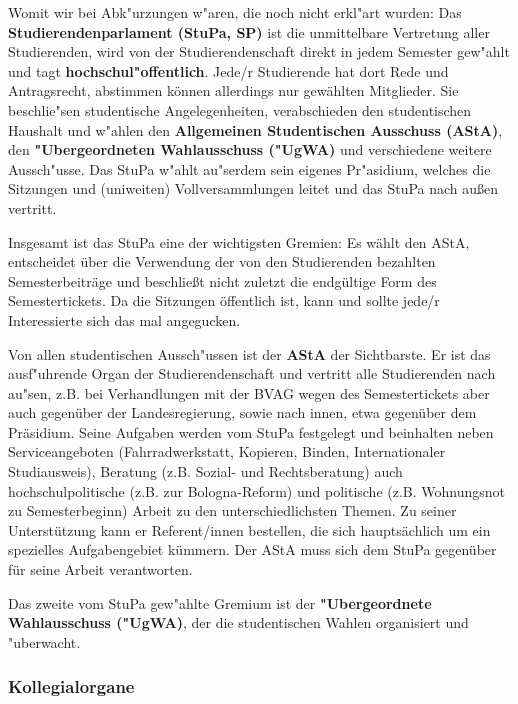 Womit wir bei Abk"urzungen w"aren, die noch nicht erkl"art wurden: Das \textbf{Studierendenparlament (StuPa, SP)} ist die 
unmittelbare Vertretung aller Studierenden, wird von der Studierendenschaft 
direkt in jedem Semester gew"ahlt und tagt \textbf{hochschul"offentlich}.
Jede/r Studierende hat dort Rede und Antragsrecht, abstimmen können allerdings nur 
gewählten Mitglieder. Sie beschlie"sen studentische Angelegenheiten, verabschieden den studentischen 
Haushalt und w"ahlen den \textbf{Allgemeinen Studentischen Ausschuss (AStA)},
den \textbf{"Ubergeordneten Wahlausschuss ("UgWA)}
und verschiedene weitere Aussch"usse. Das StuPa w"ahlt au"serdem sein eigenes
Pr"asidium, welches die Sitzungen und (uniweiten) Vollversammlungen leitet und
das StuPa nach außen  vertritt.  

Insgesamt ist das StuPa eine der wichtigsten Gremien: Es wählt den AStA, entscheidet über die Verwendung der von den Studierenden bezahlten Semesterbeiträge 
und beschließt nicht zuletzt die endgültige Form des Semestertickets. 
Da die Sitzungen öffentlich ist, kann und sollte jede/r Interessierte sich das mal angegucken.

Von allen studentischen Aussch"ussen ist der \textbf{AStA}  der
Sichtbarste. Er ist das ausf"uhrende Organ der 
Studierendenschaft und vertritt alle Studierenden nach au"sen, z.B. bei 
Verhandlungen mit der BVAG wegen des Semestertickets aber auch gegenüber der 
Landesregierung, sowie nach innen, etwa gegenüber dem Präsidium. Seine Aufgaben werden vom 
StuPa festgelegt und beinhalten neben Serviceangeboten (Fahrradwerkstatt, Kopieren, Binden, 
Internationaler Studiausweis), Beratung (z.B. Sozial- und Rechtsberatung) auch hochschulpolitische 
(z.B. zur Bologna-Reform) und politische (z.B. Wohnungsnot zu Semesterbeginn) Arbeit zu den 
unterschiedlichsten Themen. Zu seiner Unterstützung kann er Referent/innen 
bestellen, die sich hauptsächlich um ein spezielles Aufgabengebiet kümmern.
Der AStA muss sich dem StuPa gegenüber für seine Arbeit verantworten.

Das zweite vom StuPa gew"ahlte Gremium ist der \textbf{"Ubergeordnete 
Wahlausschuss ("UgWA)}, der die studentischen Wahlen organisiert und "uberwacht.

\subsubsection*{Kollegialorgane}

